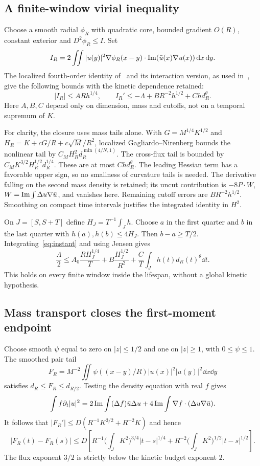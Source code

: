 \documentclass[11pt,a4paper]{article}
\theoremstyle{remark}\newtheorem{remark}[theorem]{Remark}
\begin{document}
\subsection{A finite-window virial inequality}
Choose a smooth radial $\phi_R$ with quadratic core, bounded gradient $O(R)$, constant exterior and $D^2\phi_R\le I$. Set
\[
 I_R=2\iint|u(y)|^2\nabla\phi_R(x-y)\cdot\operatorname{Im}(\bar u(x)\nabla u(x))\,\mathrm d x\,\mathrm d y.
\]
The localized fourth-order identity of~\cite{BL} and its interaction version, as used in~\cite{Komada}, give the following bounds with the kinetic dependence retained:
\begin{equation}\label{eq:instant}
 |I_R|\le ARh^{1/4},\qquad
 I_R'\le-\Lambda+BR^{-2}h^{1/2}+Chd_R^\theta.
\end{equation}
Here $A,B,C$ depend only on dimension, mass and cutoffs, not on a temporal supremum of $K$.

For clarity, the closure uses mass tails alone. With $G=M^{1/4}K^{1/2}$ and $H_R=K+cG/R+c\sqrt M/R^2$, localized Gagliardo--Nirenberg bounds the nonlinear tail by $C_MH_R^2d_R^{\min(4/N,1)}$. The cross-flux tail is bounded by $C_MK^{3/2}H_R^{1/2}d_R^{1/4}$. These are at most $Chd_R^\theta$. The leading Hessian term has a favorable upper sign, so no smallness of curvature tails is needed. The derivative falling on the second mass density is retained; its uncut contribution is $-8P\cdot W$, $W=\operatorname{Im}\int\Delta u\nabla\bar u$, and vanishes here. Remaining cutoff errors are $BR^{-2}h^{1/2}$. Smoothing on compact time intervals justifies the integrated identity in $H^2$.

On $J=[S,S+T]$ define $H_J=T^{-1}\int_Jh$. Choose $a$ in the first quarter and $b$ in the last quarter with $h(a),h(b)\le4H_J$. Then $b-a\ge T/2$. Integrating~\eqref{eq:instant} and using Jensen gives
\begin{equation}\label{eq:finitewindow}
 \boxed{\quad\frac\Lambda2\le
 A_0\frac{RH_J^{1/4}}T+B\frac{H_J^{1/2}}{R^2}
 +\frac CT\int_Jh(t)d_R(t)^\theta\dd t.\quad}
\end{equation}
This holds on every finite window inside the lifespan, without a global kinetic hypothesis.

\subsection{Mass transport closes the first-moment endpoint}
Choose smooth $\psi$ equal to zero on $|z|\le1/2$ and one on $|z|\ge1$, with $0\le\psi\le1$. The smoothed pair tail
\[
 F_R=M^{-2}\iint\psi((x-y)/R)|u(x)|^2|u(y)|^2\dd x\dd y
\]
satisfies $d_R\le F_R\le d_{R/2}$. Testing the density equation with real $f$ gives
\[
 \int f\partial_t|u|^2
 =2\operatorname{Im}\int(\Delta f)\bar u\Delta u
       +4\operatorname{Im}\int\nabla f\cdot(\Delta u\nabla\bar u).
\]
It follows that $|F_R'|\le D(R^{-1}K^{3/2}+R^{-2}K)$ and hence
\begin{equation}\label{eq:transport}
 |F_R(t)-F_R(s)|\le D\left[
 R^{-1}\Big(\int_JK^2\Big)^{3/4}|t-s|^{1/4}
 +R^{-2}\Big(\int_JK^2\Big)^{1/2}|t-s|^{1/2}\right].
\end{equation}
The flux exponent $3/2$ is strictly below the kinetic budget exponent $2$.
\end{document}
